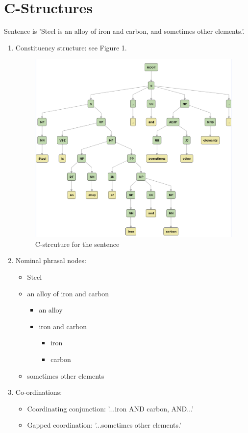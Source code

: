 \documentclass[12pt]{report}
\begin{document}
\section{C-Structures}
Sentence is 'Steel is an alloy of iron and carbon, and sometimes other
elements.'.
\begin{enumerate}
  \item Constituency structure: see Figure 1.
  \begin{figure}[ht]
    \includegraphics[width=\linewidth]{task2img.PNG}
    \caption{C-strcuture for the sentence}
    \label{Cstruct}
  \end{figure}
  \item Nominal phrasal nodes:
  \begin{itemize}
    \item Steel
    \item an alloy of iron and carbon
    \begin{itemize}
      \item an alloy
      \item iron and carbon
      \begin{itemize}
        \item iron
        \item carbon
      \end{itemize}
    \end{itemize}
    \item sometimes other elements
  \end{itemize}
  \item Co-ordinations:
  \begin{itemize}
    \item Coordinating conjunction: '...iron AND carbon, AND...'
    \item Gapped coordination: '...sometimes other elements.'
  \end{itemize}
\end{enumerate}
\end{document}
